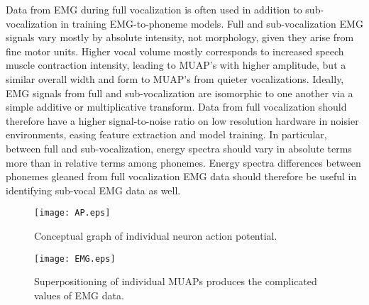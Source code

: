 \documentclass[conference]{IEEEtran}
\begin{document}
Data from EMG during full vocalization is often used in addition to sub-vocalization in training EMG-to-phoneme models. Full and sub-vocalization EMG signals vary mostly by absolute intensity, not morphology, given they arise from fine motor units. Higher vocal volume mostly corresponds to increased speech muscle contraction intensity, leading to MUAP's with higher amplitude, but a similar overall width and form to MUAP's from quieter vocalizations. Ideally, EMG signals from full and sub-vocalization are isomorphic to one another via a simple additive or multiplicative transform. Data from full vocalization should therefore have a higher signal-to-noise ratio on low resolution hardware in noisier environments, easing feature extraction and model training. In particular, between full and sub-vocalization, energy spectra should vary in absolute terms more than in relative terms among phonemes. Energy spectra differences between phonemes gleaned from full vocalization EMG data should therefore be useful in identifying sub-vocal EMG data as well.

\begin{figure}[!t]
\centering
\texttt{[image: AP.eps]}
\caption{Conceptual graph of individual neuron action potential.}
\label{fig_ap}
\end{figure}


\begin{figure}[!t]
\centering
\texttt{[image: EMG.eps]}
\caption{Superpositioning of individual MUAPs produces the complicated values of EMG data. \cite{daq}}
\label{fig_emg}
\end{figure}
\end{document}
